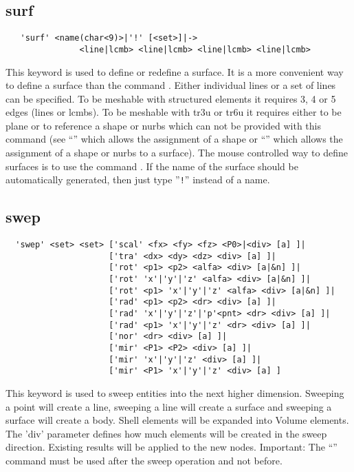 \documentclass{article}
\begin{document}
\subsection{\label{surf}surf}
\begin{verbatim}
   'surf' <name(char<9)>|'!' [<set>]|->
               <line|lcmb> <line|lcmb> <line|lcmb> <line|lcmb>  
\end{verbatim}
This keyword is used to define or redefine a surface. It is a more convenient way to define a surface than the command . Either individual lines or a set of lines can be specified. To be meshable with structured elements it requires 3, 4 or 5 edges (lines or lcmbs). To be meshable with tr3u or tr6u it requires either to be plane or to reference a shape or nurbs which can not be provided with this command (see ``'' which allows the assignment of a shape or ``'' which allows the assignment of a shape or nurbs to a surface). The mouse controlled way to define surfaces is to use the command . 
If the name of the surface should be automatically generated, then just type ''\verb_!_'' instead of a name.

\subsection{\label{swep}swep}
\begin{verbatim}
  'swep' <set> <set> ['scal' <fx> <fy> <fz> <P0>|<div> [a] ]|
                     ['tra' <dx> <dy> <dz> <div> [a] ]|
                     ['rot' <p1> <p2> <alfa> <div> [a|&n] ]|
                     ['rot' 'x'|'y'|'z' <alfa> <div> [a|&n] ]|
                     ['rot' <p1> 'x'|'y'|'z' <alfa> <div> [a|&n] ]|
                     ['rad' <p1> <p2> <dr> <div> [a] ]|
                     ['rad' 'x'|'y'|'z'|'p'<pnt> <dr> <div> [a] ]|
                     ['rad' <p1> 'x'|'y'|'z' <dr> <div> [a] ]|
                     ['nor' <dr> <div> [a] ]|
                     ['mir' <P1> <P2> <div> [a] ]|
                     ['mir' 'x'|'y'|'z' <div> [a] ]|
                     ['mir' <P1> 'x'|'y'|'z' <div> [a] ] 
\end{verbatim}
This keyword is used to sweep entities into the next higher dimension. Sweeping a point will create a line, sweeping a line will create a surface and sweeping a surface will create a body. Shell elements will be expanded into Volume elements. The 'div' parameter defines how much elements will be created in the sweep direction. Existing results will be applied to the new nodes. Important: The ``'' command must be used after the sweep operation and not before.
\end{document}

